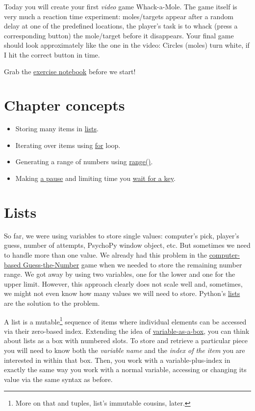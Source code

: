 \documentclass[
]{book}
\providecommand{\tightlist}{%
  \setlength{\itemsep}{0pt}\setlength{\parskip}{0pt}}
\begin{document}
Today you will create your first \emph{video} game Whack-a-Mole. The game itself is very much a reaction time experiment: moles/targets appear after a random delay at one of the predefined locations, the player's task is to whack (press a corresponding button) the mole/target before it disappears. Your final game should look approximately like the one in the video: Circles (moles) turn white, if I hit the correct button in time.

Grab the \href{notebooks/Whack-a-mole.ipynb}{exercise notebook} before we start!

\hypertarget{chapter-concepts-4}{%
\section{Chapter concepts}\label{chapter-concepts-4}}

\begin{itemize}
\tightlist
\item
  Storing many items in \protect\hyperlink{lists}{lists}.
\item
  Iterating over items using \protect\hyperlink{for-loop}{for} loop.
\item
  Generating a range of numbers using \protect\hyperlink{range}{range()}.
\item
  Making \protect\hyperlink{clock-wait}{a pause} and limiting time you \protect\hyperlink{waitKeys-maxwait}{wait for a key}.
\end{itemize}

\hypertarget{lists}{%
\section{Lists}\label{lists}}

So far, we were using variables to store single values: computer's pick, player's guess, number of attempts, PsychoPy window object, etc. But sometimes we need to handle more than one value. We already had this problem in the \protect\hyperlink{guess-the-number-ai}{computer-based Guess-the-Number} game when we needed to store the remaining number range. We got away by using two variables, one for the lower and one for the upper limit. However, this approach clearly does not scale well and, sometimes, we might not even know how many values we will need to store. Python's \href{https://docs.python.org/3/library/stdtypes.html\#lists}{lists} are the solution to the problem.

A list is a mutable\footnote{More on that and tuples, list's immutable cousins, later.} sequence of items where individual elements can be accessed via their zero-based index. Extending the idea of \protect\hyperlink{variables}{variable-as-a-box}, you can think about lists as a box with numbered slots. To store and retrieve a particular piece you will need to know both the \emph{variable name} and the \emph{index of the item} you are interested in within that box. Then, you work with a variable-plus-index in exactly the same way you work with a normal variable, accessing or changing its value via the same syntax as before.
\end{document}
